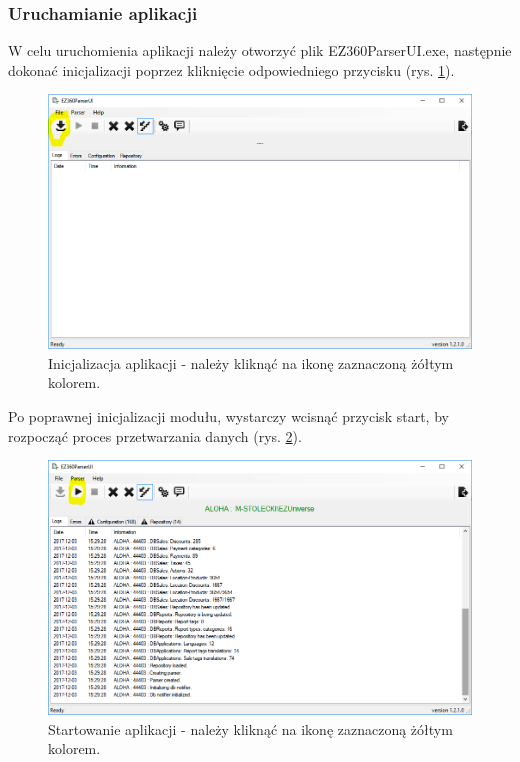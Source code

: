 \documentclass[a4paper]{book}
\begin{document}
\subsubsection{Uruchamianie aplikacji}
W celu uruchomienia aplikacji należy otworzyć plik EZ360ParserUI.exe, następnie dokonać inicjalizacji poprzez kliknięcie odpowiedniego przycisku (rys. \ref{fig:inicjalizacja_aplikacji}).
\begin{figure}[t]
	\centering
	\includegraphics[width=\textwidth]{./img/inicjalizacja_aplikacji.png}
	\caption{Inicjalizacja aplikacji - należy kliknąć na ikonę zaznaczoną żółtym kolorem.}
	\label{fig:inicjalizacja_aplikacji}
\end{figure}
Po poprawnej inicjalizacji modułu, wystarczy wcisnąć przycisk start, by rozpocząć proces przetwarzania danych (rys. \ref{fig:startowanie_aplikacji}).
\begin{figure}[t]
	\centering
	\includegraphics[width=\textwidth]{./img/startowanie_aplikacji.png}
	\caption{Startowanie aplikacji - należy kliknąć na ikonę zaznaczoną żółtym kolorem.}
	\label{fig:startowanie_aplikacji}
\end{figure}
\end{document}

